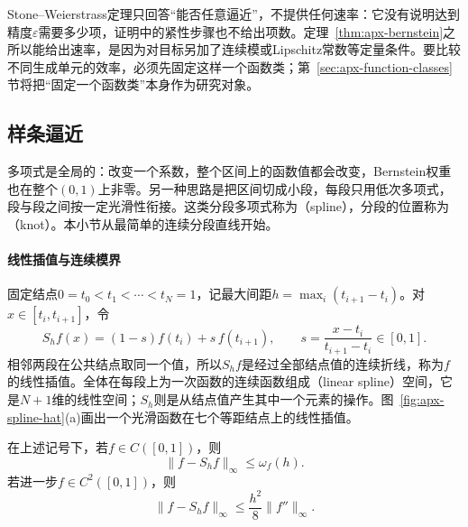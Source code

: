Stone--Weierstrass定理只回答“能否任意逼近”，不提供任何速率：它没有说明达到精度$\varepsilon$需要多少项，证明中的紧性步骤也不给出项数。定理~\ref{thm:apx-bernstein}之所以能给出速率，是因为对目标另加了连续模或Lipschitz常数等定量条件。要比较不同生成单元的效率，必须先固定这样一个函数类；第~\ref{sec:apx-function-classes}节将把“固定一个函数类”本身作为研究对象。

\subsection{样条逼近}
\label{sec:apx-splines}

多项式是全局的：改变一个系数，整个区间上的函数值都会改变，Bernstein权重也在整个$(0,1)$上非零。另一种思路是把区间切成小段，每段只用低次多项式，段与段之间按一定光滑性衔接。这类分段多项式称为（spline），分段的位置称为（knot）。本小节从最简单的连续分段直线开始。

\paragraph{线性插值与连续模界}

固定结点$0=t_0<t_1<\cdots<t_N=1$，记最大间距$h=\max_i(t_{i+1}-t_i)$。对$x\in[t_i,t_{i+1}]$，令
\begin{equation}
  S_hf(x)=(1-s)f(t_i)+s\,f(t_{i+1}),\qquad s=\frac{x-t_i}{t_{i+1}-t_i}\in[0,1].
  \label{eq:apx-linear-interpolant}
\end{equation}
相邻两段在公共结点取同一个值，所以$S_hf$是经过全部结点值的连续折线，称为$f$的线性插值。全体在每段上为一次函数的连续函数组成（linear spline）空间，它是$N+1$维的线性空间；$S_h$则是从结点值产生其中一个元素的操作。图~\ref{fig:apx-spline-hat}(a)画出一个光滑函数在七个等距结点上的线性插值。

\begin{theorem}[线性插值的误差]
\label{thm:apx-linear-interpolation}
在上述记号下，若$f\in C([0,1])$，则
\begin{equation}
  \|f-S_hf\|_\infty\le\omega_f(h).
  \label{eq:apx-spline-modulus}
\end{equation}
若进一步$f\in C^2([0,1])$，则
\begin{equation}
  \|f-S_hf\|_\infty\le\frac{h^2}{8}\|f''\|_\infty .
  \label{eq:apx-spline-quadratic}
\end{equation}
\end{theorem}

